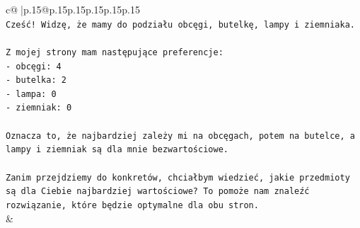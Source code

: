 \documentclass{article}
\begin{document}
{\begin{supertabular}{c@{$\;$}|p{.15\linewidth}@{}p{.15\linewidth}p{.15\linewidth}p{.15\linewidth}p{.15\linewidth}p{.15\linewidth}}
{{{\\ 
\texttt{Cześć! Widzę, że mamy do podziału obcęgi, butelkę, lampy i ziemniaka.} \\
\\ 
\texttt{Z mojej strony mam następujące preferencje:} \\
\texttt{{-} obcęgi: 4} \\
\texttt{{-} butelka: 2} \\
\texttt{{-} lampa: 0} \\
\texttt{{-} ziemniak: 0} \\
\\ 
\texttt{Oznacza to, że najbardziej zależy mi na obcęgach, potem na butelce, a lampy i ziemniak są dla mnie bezwartościowe.} \\
\\ 
\texttt{Zanim przejdziemy do konkretów, chciałbym wiedzieć, jakie przedmioty są dla Ciebie najbardziej wartościowe? To pomoże nam znaleźć rozwiązanie, które będzie optymalne dla obu stron.} \\
            }
        }
    }
    & \\ \\


\end{supertabular}}
\end{document}
